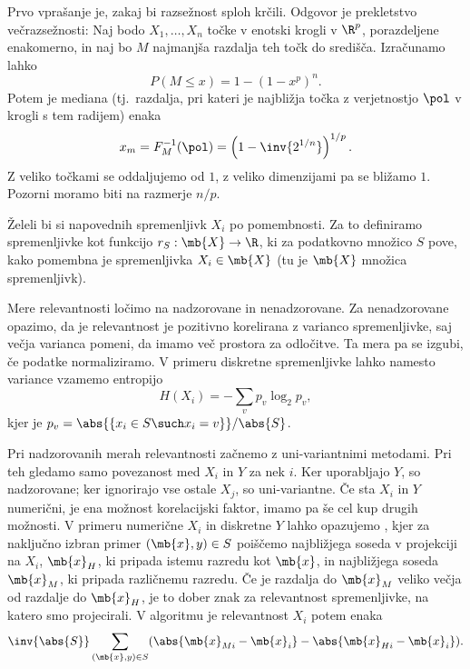 
Prvo vprašanje je, zakaj bi razsežnost sploh krčili.
Odgovor je prekletstvo večrazsežnosti:
Naj bodo $X_1, \ldots, X_n$ točke v enotski krogli v $\R^p$, porazdeljene
enakomerno, in naj bo $M$ najmanjša razdalja teh točk do središča.
Izračunamo lahko
\[
  P(M \le x) = 1 - (1 - x^p)^n.
\]
Potem je mediana (tj.~razdalja, pri kateri je najbližja točka z verjetnostjo
$\pol$ v krogli s tem radijem) enaka
\[
  x_m = F_M^{-1}(\pol) = \left( 1 - \inv{2^{1/n}} \right)^{1/p}.
\]
Z veliko točkami se oddaljujemo od $1$, z veliko dimenzijami pa se bližamo $1$.
Pozorni moramo biti na razmerje $n/p$.


Želeli bi si  napovednih spremenljivk $X_i$ po pomembnosti.
Za to definiramo  spremenljivke kot funkcijo $r_S : \mb{X}
\to \R$, ki za podatkovno množico $S$ pove, kako pomembna je spremenljivka $X_i
\in \mb{X}$ (tu je $\mb{X}$ množica spremenljivk).

Mere relevantnosti ločimo na nadzorovane in nenadzorovane.
Za nenadzorovane opazimo, da je relevantnost je pozitivno korelirana z varianco
spremenljivke, saj večja varianca pomeni, da imamo več prostora za odločitve.
Ta mera pa se izgubi, če podatke normaliziramo.
V primeru diskretne spremenljivke lahko namesto variance vzamemo entropijo
\[
  H(X_i) = - \sum_{v} p_v \log_2 p_v,
\]
kjer je $p_v = \abs{\{x_i \in S \such x_i = v\}} / \abs{S}$.


Pri nadzorovanih merah relevantnosti začnemo z uni-variantnimi metodami.
Pri teh gledamo samo povezanost med $X_i$ in $Y$ za nek $i$.
Ker uporabljajo $Y$, so nadzorovane; ker ignorirajo vse ostale $X_j$, so
uni-variantne.
Če sta $X_i$ in $Y$ numerični, je ena možnost korelacijski faktor, imamo pa še
cel kup drugih možnosti.
V primeru numerične $X_i$ in diskretne $Y$ lahko opazujemo , kjer
za naključno izbran primer $(\mb{x},y) \in S$ poiščemo najbližjega soseda v
projekciji na $X_i$, $\mb{x}_H$, ki pripada istemu razredu kot $\mb{x}$, in
najbližjega soseda $\mb{x}_M$, ki pripada različnemu razredu.
Če je razdalja do $\mb{x}_M$ veliko večja od razdalje do $\mb{x}_H$, je to dober
znak za relevantnost spremenljivke, na katero smo projecirali.
V algoritmu je relevantnost $X_i$ potem enaka
\[
  \inv{\abs{S}} \sum_{(\mb{x}, y) \in S} (\abs{\mb{x}_{Mi} - \mb{x}_i} -
  \abs{\mb{x}_{Hi} - \mb{x}_i}).
\]

